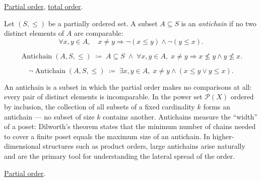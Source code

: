 \begin{remark*}[Dependencies]
\hyperref[def:partial-order]{Partial order},
\hyperref[def:total-order]{total order}.
\end{remark*}


\begin{tcolorbox}[colback=defbox, colframe=defborder, arc=2pt,
  left=6pt, right=6pt, top=4pt, bottom=4pt,
  title={\small\textbf{Definition (Antichain)}},
  fonttitle=\small\bfseries]
\begin{definition}[Antichain]
\label{def:antichain}
Let $(S, \leq)$ be a partially ordered set.  A subset $A \subseteq S$ is
an \emph{antichain} if no two distinct elements of $A$ are comparable:
\[
\forall x, y \in A, \quad x \neq y \Longrightarrow \neg(x \leq y) \land \neg(y \leq x).
\]
\end{definition}
\end{tcolorbox}

\begin{remark*}
\[
\operatorname{Antichain}(A, S, \leq)
\;\coloneqq\;
A \subseteq S
\;\land\;
\forall x, y \in A,\; x \neq y \Rightarrow x \not\leq y \land y \not\leq x.
\]
\end{remark*}

\begin{remark*}
\[
\neg\operatorname{Antichain}(A, S, \leq)
\;\coloneqq\;
\exists x, y \in A,\; x \neq y \land (x \leq y \lor y \leq x).
\]
\end{remark*}

\begin{remark*}[Interpretation]
An antichain is a subset in which the partial order makes no comparisons at
all: every pair of distinct elements is incomparable.  In the power set
$\mathcal{P}(X)$ ordered by inclusion, the collection of all subsets of
a fixed cardinality $k$ forms an antichain — no subset of size $k$ contains
another.  Antichains measure the ``width'' of a poset: Dilworth's theorem
states that the minimum number of chains needed to cover a finite poset
equals the maximum size of an antichain.  In higher-dimensional structures
such as product orders, large antichains arise naturally and are the primary
tool for understanding the lateral spread of the order.
\end{remark*}

\begin{remark*}[Dependencies]
\hyperref[def:partial-order]{Partial order}.
\end{remark*}

